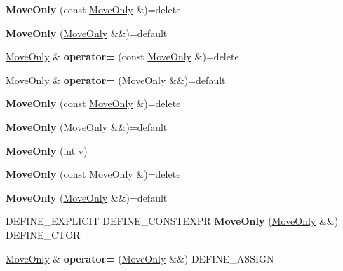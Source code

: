 \begin{DoxyCompactItemize}
\item 
\mbox{\label{class_move_only_af0827ac99621d97d09845d7d20d8335d}} 
{\bfseries Move\+Only} (const \mbox{\hyperlink{class_move_only}{Move\+Only}} \&)=delete
\item 
\mbox{\label{class_move_only_a40d528ed5eaad59678a8c69900433215}} 
{\bfseries Move\+Only} (\mbox{\hyperlink{class_move_only}{Move\+Only}} \&\&)=default
\item 
\mbox{\label{class_move_only_a662284f89264bb322356d57c85e461a6}} 
\mbox{\hyperlink{class_move_only}{Move\+Only}} \& {\bfseries operator=} (const \mbox{\hyperlink{class_move_only}{Move\+Only}} \&)=delete
\item 
\mbox{\label{class_move_only_aa3d3bdd12de5f331c0dc39488383f1e9}} 
\mbox{\hyperlink{class_move_only}{Move\+Only}} \& {\bfseries operator=} (\mbox{\hyperlink{class_move_only}{Move\+Only}} \&\&)=default
\item 
\mbox{\label{class_move_only_af0827ac99621d97d09845d7d20d8335d}} 
{\bfseries Move\+Only} (const \mbox{\hyperlink{class_move_only}{Move\+Only}} \&)=delete
\item 
\mbox{\label{class_move_only_a40d528ed5eaad59678a8c69900433215}} 
{\bfseries Move\+Only} (\mbox{\hyperlink{class_move_only}{Move\+Only}} \&\&)=default
\item 
\mbox{\label{class_move_only_a3d5e7619a53adf85f8d7367bff6f674b}} 
{\bfseries Move\+Only} (int v)
\item 
\mbox{\label{class_move_only_af0827ac99621d97d09845d7d20d8335d}} 
{\bfseries Move\+Only} (const \mbox{\hyperlink{class_move_only}{Move\+Only}} \&)=delete
\item 
\mbox{\label{class_move_only_a40d528ed5eaad59678a8c69900433215}} 
{\bfseries Move\+Only} (\mbox{\hyperlink{class_move_only}{Move\+Only}} \&\&)=default
\item 
\mbox{\label{class_move_only_a71e4dd6ab8630c783c83535f551705da}} 
D\+E\+F\+I\+N\+E\+\_\+\+E\+X\+P\+L\+I\+C\+IT D\+E\+F\+I\+N\+E\+\_\+\+C\+O\+N\+S\+T\+E\+X\+PR {\bfseries Move\+Only} (\mbox{\hyperlink{class_move_only}{Move\+Only}} \&\&) D\+E\+F\+I\+N\+E\+\_\+\+C\+T\+OR
\item 
\mbox{\label{class_move_only_a0e5a2bfa0b5a404109ca76702e367452}} 
\mbox{\hyperlink{class_move_only}{Move\+Only}} \& {\bfseries operator=} (\mbox{\hyperlink{class_move_only}{Move\+Only}} \&\&) D\+E\+F\+I\+N\+E\+\_\+\+A\+S\+S\+I\+GN
\end{DoxyCompactItemize}
